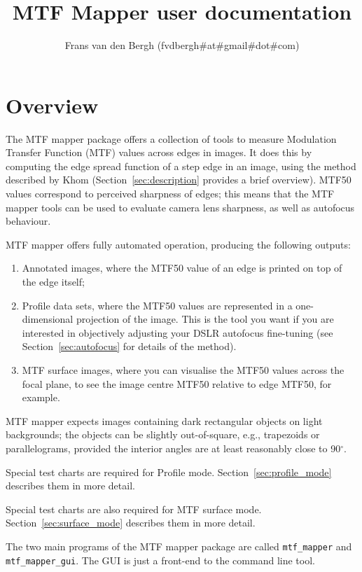 \documentclass[a4paper]{article}
\title{MTF Mapper user documentation}
\author{Frans van den Bergh (fvdbergh\#at\#gmail\#dot\#com)}
\begin{document}
\maketitle

\tableofcontents

\newpage

\section{Overview}
The MTF mapper package offers a collection of tools to measure Modulation
Transfer Function (MTF) values across edges in images. 
It does this by computing the edge spread function of a step edge in an
image, using the method described by Khom \cite{khom}
(Section~\ref{sec:description} provides a brief overview).
MTF50 values correspond to perceived sharpness of edges; this means that the
MTF mapper tools can be used to evaluate camera lens sharpness, as well as
autofocus behaviour.

MTF mapper offers fully automated operation, producing the following
outputs:
\begin{enumerate}
    \item Annotated images, where the MTF50 value of an edge is printed on top
of the edge itself;
    \item Profile data sets, where the MTF50 values are represented in a
one-dimensional projection of the image. This is the tool you want if you
are interested in objectively adjusting your DSLR autofocus fine-tuning (see
Section~\ref{sec:autofocus} for details of the method).
    \item MTF surface images, where you can visualise the MTF50 values
across the focal plane, to see the image centre MTF50 relative to edge MTF50,
for example.
\end{enumerate}

MTF mapper expects images containing dark rectangular objects on light
backgrounds; the objects can be slightly out-of-square, e.g., trapezoids or
parallelograms, provided the interior angles are at least reasonably close
to 90$^\circ$.

Special test charts are required for Profile mode.
Section~\ref{sec:profile_mode} describes them in more detail.

Special test charts are also required for MTF surface mode.
Section~\ref{sec:surface_mode} describes them in more detail.

The two main programs of the MTF mapper package are called \verb+mtf_mapper+
and \verb+mtf_mapper_gui+. The GUI is just a front-end to the command line
tool.
\end{document}
